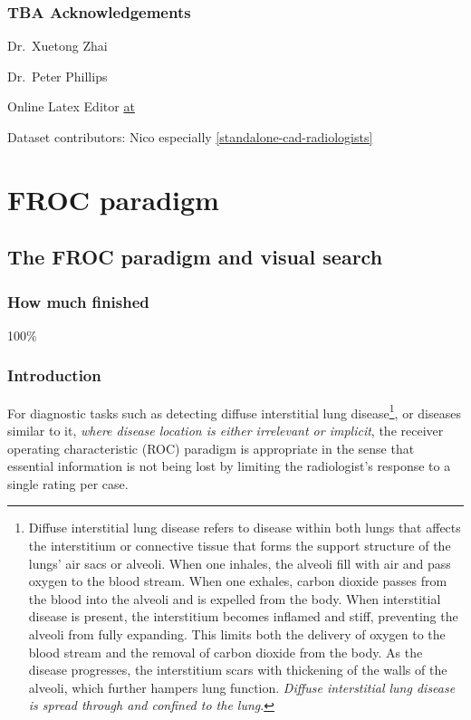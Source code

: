 \documentclass[
]{book}
\begin{document}
\hypertarget{tba-acknowledgements}{%
\section{TBA Acknowledgements}\label{tba-acknowledgements}}

Dr.~Xuetong Zhai

Dr.~Peter Phillips

Online Latex Editor \href{https://latexeditor.lagrida.com/}{at}

Dataset contributors: Nico especially \ref{standalone-cad-radiologists}

\hypertarget{part-froc-paradigm}{%
\part*{FROC paradigm}\label{part-froc-paradigm}}

\hypertarget{froc-paradigm}{%
\chapter{The FROC paradigm and visual search}\label{froc-paradigm}}

\hypertarget{froc-paradigm-how-much-finished}{%
\section{How much finished}\label{froc-paradigm-how-much-finished}}

100\%

\hypertarget{froc-paradigm-intro}{%
\section{Introduction}\label{froc-paradigm-intro}}

For diagnostic tasks such as detecting diffuse interstitial lung disease\footnote{Diffuse interstitial lung disease refers to disease within both lungs that affects the interstitium or connective tissue that forms the support structure of the lungs' air sacs or alveoli. When one inhales, the alveoli fill with air and pass oxygen to the blood stream. When one exhales, carbon dioxide passes from the blood into the alveoli and is expelled from the body. When interstitial disease is present, the interstitium becomes inflamed and stiff, preventing the alveoli from fully expanding. This limits both the delivery of oxygen to the blood stream and the removal of carbon dioxide from the body. As the disease progresses, the interstitium scars with thickening of the walls of the alveoli, which further hampers lung function. \emph{Diffuse interstitial lung disease is spread through and confined to the lung}.}, or diseases similar to it, \emph{where disease location is either irrelevant or implicit}, the receiver operating characteristic (ROC) paradigm is appropriate in the sense that essential information is not being lost by limiting the radiologist's response to a single rating per case.
\end{document}
